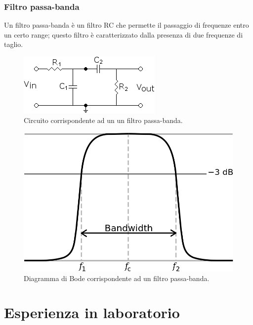 \documentclass{article}
\begin{document}
			\subsubsection{Filtro passa-banda}
				Un filtro passa-banda è un filtro RC che permette il passaggio di frequenze entro un certo range; questo filtro è caratterizzato dalla presenza di due frequenze di taglio.
				\begin{figure}[h!]
					\centering
					\includegraphics[scale=0.6]{filtroPassaBanda}
					\caption{Circuito corrispondente ad un un filtro passa-banda.}
					\label{fig:filtroPassaBanda}
				\end{figure}
				\newline
				\begin{figure}[h!]
					\centering
					\includegraphics[scale=0.4]{filtroPassaBandaBode}
					\caption{Diagramma di Bode corrispondente ad un filtro passa-banda.}
					\label{fig:filtroPassaBandaBode}
				\end{figure}
	\section{Esperienza in laboratorio}
\end{document}
